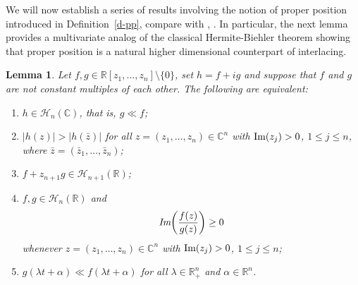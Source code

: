 \documentclass[10pt,reqno]{amsart}
\theoremstyle{plain}
\newtheorem{lemma}[theorem]{Lemma}
\theoremstyle{definition}
\theoremstyle{remark}
\numberwithin{equation}{section}
\newcommand{\HH}{\mathcal{H}}
\newcommand{\RR}{\mathbb{R}}
\newcommand{\CC}{\mathbb{C}}
\renewcommand{\Im}{{\rm Im}}
\begin{document}
We will now establish a series of results involving the notion of proper
position introduced in Definition~\ref{d-pp}, compare with 
\cite[\S 2]{BBS3}, \cite[Theorem~3.2]{COSW}. In particular, the next lemma 
provides a multivariate analog of the classical Hermite-Biehler 
theorem showing that proper position is a natural higher dimensional 
counterpart of interlacing. 

\begin{lemma}\label{krein}
Let $ f,g \in \RR[z_1,\ldots, z_n]\setminus \{0\}$, set $h = f+ig$ and 
suppose that $f$ and $g$ are not constant multiples of each other. 
The following  are equivalent: 
\begin{enumerate}
\item $h\in\HH_n(\CC)$, that is, $g\ll f$;
\item $|h(z)|>|h(\bar{z})|$ for all $z=(z_1,\ldots,z_n)\in\CC^n$ with 
$\Im(z_j)>0$, $1\le j\le n$, where $\bar{z}=(\bar{z}_1,\ldots,\bar{z}_n)$; 
\item $f+z_{n+1}g\in\HH_{n+1}(\RR)$;
\item $f,g\in\HH_n(\RR)$ and 
$$
\text{{\em Im}}\!\left(\frac{f(z)}{g(z)}\right)\ge 0
$$
whenever $z=(z_1,\ldots,z_n)\in\CC^n$ with $\Im(z_j)>0$, $1\le j\le n$;
\item $g(\lambda t+\alpha)\ll f(\lambda t+\alpha)$ for all $\lambda\in\RR_+^n$
and $\alpha\in\RR^n$.
\end{enumerate}
\end{lemma}
\end{document}
